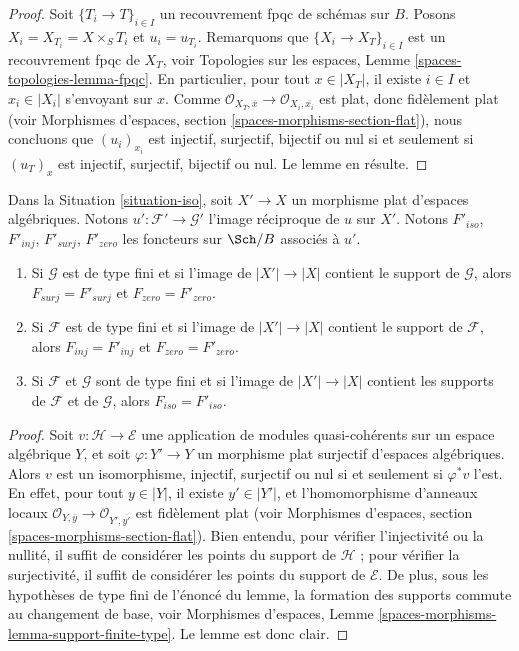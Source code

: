 \begin{proof}
Soit $\{T_i \to T\}_{i \in I}$ un recouvrement fpqc de schémas sur $B$.
Posons $X_i = X_{T_i} = X \times_S T_i$ et $u_i = u_{T_i}$.
Remarquons que $\{X_i \to X_T\}_{i \in I}$ est un recouvrement fpqc de $X_T$, voir
Topologies sur les espaces, Lemme \ref{spaces-topologies-lemma-fpqc}.
En particulier, pour tout $x \in |X_T|$, il existe $i \in I$
et $x_i \in |X_i|$ s'envoyant sur $x$. Comme
$\mathcal{O}_{X_T, \overline{x}} \to \mathcal{O}_{X_i, \overline{x_i}}$
est plat, donc fidèlement plat (voir
Morphismes d'espaces, section \ref{spaces-morphisms-section-flat}),
nous concluons que $(u_i)_{x_i}$ est injectif, surjectif, bijectif ou nul
si et seulement si $(u_T)_x$ est injectif, surjectif, bijectif ou nul.
Le lemme en résulte.
\end{proof}

\begin{lemma}
\label{lemma-iso-go-up}
Dans la Situation \ref{situation-iso}, soit $X' \to X$ un morphisme plat
d'espaces algébriques. Notons $u' : \mathcal{F}' \to \mathcal{G}'$
l'image réciproque de $u$ sur $X'$. Notons $F'_{iso}$, $F'_{inj}$, $F'_{surj}$,
$F'_{zero}$ les foncteurs sur $\Sch/B$ associés à $u'$.
\begin{enumerate}
\item Si $\mathcal{G}$ est de type fini et si l'image de $|X'| \to |X|$
contient le support de $\mathcal{G}$, alors $F_{surj} = F'_{surj}$
et $F_{zero} = F'_{zero}$.
\item Si $\mathcal{F}$ est de type fini et si l'image de $|X'| \to |X|$
contient le support de $\mathcal{F}$, alors $F_{inj} = F'_{inj}$
et $F_{zero} = F'_{zero}$.
\item Si $\mathcal{F}$ et $\mathcal{G}$ sont de type fini et si l'image de
$|X'| \to |X|$ contient les supports de $\mathcal{F}$ et de $\mathcal{G}$,
alors $F_{iso} = F'_{iso}$.
\end{enumerate}
\end{lemma}

\begin{proof}
Soit $v : \mathcal{H} \to \mathcal{E}$ une application de modules
quasi-cohérents sur un espace algébrique $Y$, et soit $\varphi : Y' \to Y$ un
morphisme plat surjectif d'espaces algébriques. Alors $v$ est
un isomorphisme, injectif, surjectif ou nul si et seulement si $\varphi^*v$ l'est.
En effet,
pour tout $y \in |Y|$, il existe $y' \in |Y'|$, et l'homomorphisme
d'anneaux locaux
$\mathcal{O}_{Y, \overline{y}} \to \mathcal{O}_{Y', \overline{y'}}$
est fidèlement plat (voir
Morphismes d'espaces, section \ref{spaces-morphisms-section-flat}).
Bien entendu, pour vérifier l'injectivité ou la nullité, il suffit de considérer
les points du support de $\mathcal{H}$ ; pour vérifier la
surjectivité, il suffit de considérer les points du support de $\mathcal{E}$.
De plus, sous les hypothèses de type fini de l'énoncé du
lemme, la formation des supports commute au changement de base, voir
Morphismes d'espaces, Lemme \ref{spaces-morphisms-lemma-support-finite-type}.
Le lemme est donc clair.
\end{proof}

